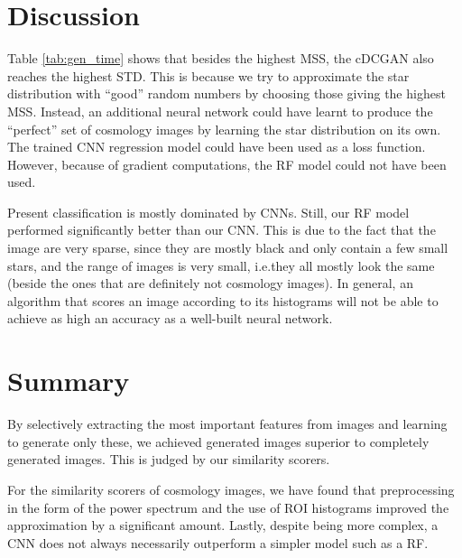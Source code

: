 \documentclass[10pt,conference,compsocconf]{IEEEtran}
\newcommand\TODO[1]{\textcolor{red}{#1}} %
\begin{document}
\section{Discussion}
Table \ref{tab:gen_time} shows that besides the highest MSS, the cDCGAN also reaches the highest STD. This is because we try to approximate the star distribution with ``good'' random numbers by choosing those giving the highest MSS. Instead, an additional neural network could have learnt to produce the ``perfect'' set of cosmology images by learning the star distribution on its own. The trained CNN regression model could have been used as a loss function. However, because of gradient computations, the RF model could not have been used. 

Present classification is mostly dominated by CNNs. Still, our RF model performed significantly better than our CNN. This is due to the fact that the image are very sparse, since they are mostly black and only contain a few small stars, and the range of images is very small, i.e.\@ they all mostly look the same (beside the ones that are definitely not cosmology images). In general, an algorithm that scores an image according to its histograms will not be able to achieve as high an accuracy as a well-built neural network. 

\section{Summary}
By selectively extracting the most important features from images and learning to generate only these, we achieved generated images superior to completely generated images.
This is judged by our similarity scorers. 

For the similarity scorers of cosmology images, we have found that preprocessing in the form of the power spectrum and the use of ROI histograms improved the approximation by a significant amount. Lastly, despite being more complex, a CNN does not always necessarily outperform a simpler model such as a RF.





\end{document}
